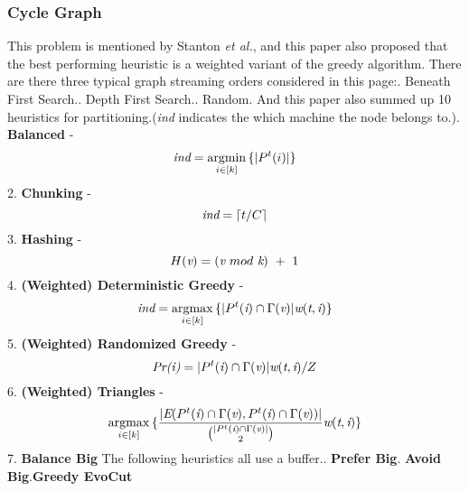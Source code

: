 \documentclass{article}
\DeclareMathOperator*{\argmin}{argmin}
\DeclareMathOperator*{\argmax}{argmax}
\begin{document}
	\subsubsection{Cycle Graph} This problem is mentioned by Stanton \emph{et al.}\cite{stanton2012streaming}, and this paper also proposed that the best performing heuristic is a weighted variant of the greedy algorithm. There are there three typical graph streaming orders considered in this page:. Beneath First Search.. Depth First Search.. Random.\newline
	And this paper also summed up 10 heuristics for partitioning.(\emph{ind} indicates the which machine the node belongs to.). \textbf{Balanced} - \begin{equation} \emph{ind} = \mathop{\argmin}_{i\in[k]}{\{|P^t(i)|\}} \end{equation}
	2. \textbf{Chunking} - \begin{equation} \emph{ind} = \lceil t/C \rceil \end{equation}						%
	3. \textbf{Hashing} - \begin{equation} H(\emph{v}) = (\emph{v}~mod~\emph{k})~+~1 \end{equation}
	4. \textbf{(Weighted) Deterministic Greedy} - \begin{equation} \emph{ind}=\mathop{\argmax}_{i\in[k]}{\{|P^t(\emph{i})\cap\Gamma(\emph{v})|\emph{w}(\emph{t},\emph{i})\}} \end{equation}
	5. \textbf{(Weighted) Randomized Greedy} - \begin{equation} \emph{Pr(i)}=|P^t(\emph{i})\cap\Gamma(\emph{v})|\emph{w}(\emph{t},\emph{i})/Z \end{equation}
	6. \textbf{(Weighted) Triangles} - 
	\begin{equation}
		\mathop{\argmax}_{i\in[k]}{\{\frac{|\emph{E}(P^t(\emph{i})\cap\Gamma(\emph{v}), P^t(\emph{i})\cap\Gamma(\emph{v}))|}
		{\binom{|P^t(\emph{i})\cap\Gamma(\emph{v})|}{2}}\emph{w}(\emph{t},\emph{i})\}}
	\end{equation}
	7. \textbf{Balance Big}
	The following heuristics all use a buffer.. \textbf{Prefer Big}. \textbf{Avoid Big}.\textbf{Greedy EvoCut}\cite{andersen2009finding}
\end{document}
